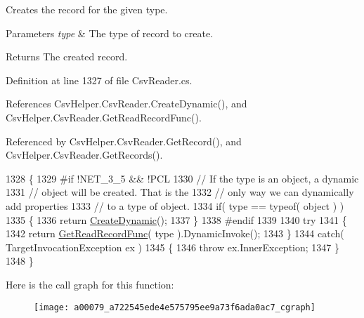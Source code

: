 Creates the record for the given type. 


\begin{DoxyParams}{Parameters}
{\em type} & The type of record to create.\\
\hline
\end{DoxyParams}
\begin{DoxyReturn}{Returns}
The created record.
\end{DoxyReturn}


Definition at line 1327 of file Csv\-Reader.\-cs.



References Csv\-Helper.\-Csv\-Reader.\-Create\-Dynamic(), and Csv\-Helper.\-Csv\-Reader.\-Get\-Read\-Record\-Func().



Referenced by Csv\-Helper.\-Csv\-Reader.\-Get\-Record(), and Csv\-Helper.\-Csv\-Reader.\-Get\-Records().


\begin{DoxyCode}
1328         \{
1329 \textcolor{preprocessor}{#if !NET\_3\_5 && !PCL
}
1330 \textcolor{preprocessor}{}            \textcolor{comment}{// If the type is an object, a dynamic}
1331             \textcolor{comment}{// object will be created. That is the}
1332             \textcolor{comment}{// only way we can dynamically add properties}
1333             \textcolor{comment}{// to a type of object.}
1334             \textcolor{keywordflow}{if}( type == typeof( \textcolor{keywordtype}{object} ) )
1335             \{
1336                 \textcolor{keywordflow}{return} \hyperlink{a00079_a4b6150b5ff8a85d9cf05aa1027554a50}{CreateDynamic}();
1337             \}
1338 \textcolor{preprocessor}{#endif
}
1339 \textcolor{preprocessor}{}
1340             \textcolor{keywordflow}{try}
1341             \{
1342                 \textcolor{keywordflow}{return} \hyperlink{a00079_a80a053f470462225c390208e27a1132a}{GetReadRecordFunc}( type ).DynamicInvoke();
1343             \}
1344             \textcolor{keywordflow}{catch}( TargetInvocationException ex )
1345             \{
1346                 \textcolor{keywordflow}{throw} ex.InnerException;
1347             \}
1348         \}
\end{DoxyCode}


Here is the call graph for this function\-:
\nopagebreak
\begin{figure}[H]
\begin{center}
\leavevmode
\texttt{[image: a00079\_a722545ede4e575795ee9a73f6ada0ac7\_cgraph]}
\end{center}
\end{figure}




